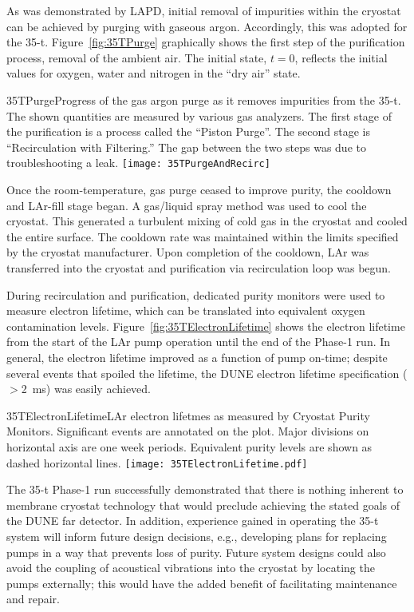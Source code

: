As was demonstrated by LAPD, initial removal of impurities within the cryostat can be
achieved by purging with gaseous argon. Accordingly, this 
was adopted for the 35-t.   Figure~\ref{fig:35TPurge} graphically shows the
first step of the purification process, removal of the ambient air.
The initial state, $t=0$, reflects the initial values for oxygen, water and
nitrogen in the ``dry air'' state.
\begin{cdrfigure}{35TPurge}{Progress of the gas argon purge as it removes impurities  from the 35-t. The shown quantities are measured by various gas analyzers. The first stage of the purification is a process called the ``Piston Purge''.  The second stage is ``Recirculation with Filtering.'' The gap between the two steps was due to troubleshooting a leak.}
\texttt{[image: 35TPurgeAndRecirc]}
\end{cdrfigure}

Once the room-temperature, gas purge ceased to improve purity,
the cooldown and LAr-fill stage began.  A gas/liquid spray method was
used to cool the cryostat.  This generated a turbulent mixing of cold
gas in the cryostat and cooled the entire surface.  The cooldown rate
was maintained within the limits specified by the cryostat
manufacturer.  Upon completion of the cooldown, LAr was transferred
into the cryostat and purification via recirculation loop was begun.

During recirculation and purification, dedicated purity monitors were
used to measure electron lifetime, which can be translated into
equivalent oxygen contamination levels.
Figure~\ref{fig:35TElectronLifetime} shows the electron lifetime from
the start of the LAr pump operation until the end of the Phase-1 run.
In general, the electron lifetime improved as a function of pump
on-time; despite several events that spoiled the lifetime, the DUNE
electron lifetime specification ($>$2~ms) was easily achieved.
\begin{cdrfigure}{35TElectronLifetime}{LAr electron lifetmes as measured by
Cryostat Purity Monitors. Significant events are annotated on the plot. Major divisions on horizontal axis
are one week periods. Equivalent purity levels are shown as dashed horizontal lines.}
\texttt{[image: 35TElectronLifetime.pdf]}
\end{cdrfigure}

The 35-t Phase-1 run successfully demonstrated that there is nothing
inherent to membrane cryostat technology that would preclude achieving
the stated goals of the DUNE far detector. In addition, experience
gained in operating the 35-t system will inform future design
decisions, e.g., developing plans for replacing pumps in a way that
prevents loss of purity.  Future system designs could also avoid the
coupling of acoustical vibrations into the cryostat by locating the
pumps externally; this would have the added benefit of facilitating
maintenance and repair.

